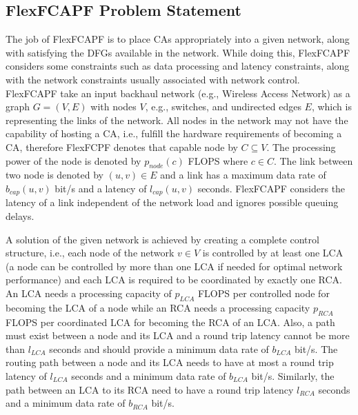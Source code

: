 \subsection{FlexFCAPF Problem Statement}\label{sec:ffps}
The job of FlexFCAPF is to place CAs appropriately into a given network, along with satisfying the DFGs available in the network. While doing this, FlexFCAPF considers some constraints such as data processing and latency constraints, along with the network constraints usually associated with network control. FlexFCAPF take an input backhaul network (e.g., Wireless Access Network) as a graph $G = ( V, E )$ with nodes $V$, e.g., switches, and undirected edges $E$, which is representing the links of the network. All nodes in the network may not have the capability of hosting a CA, i.e., fulfill the hardware requirements of becoming a CA, therefore FlexFCPF denotes that capable node by $C \subseteq V$. The processing power of the node is denoted by $p_{node} ( c )$ FLOPS where $c \in C$. The link between two node is denoted by $( u, v ) \in E$ and a link has a maximum data rate of $b_{cap} ( u, v )$ bit/s and a latency of $l_{cap} ( u , v )$ seconds. FlexFCAPF considers the latency of a link independent of the network load and ignores possible queuing delays.

A solution of the given network is achieved by creating a complete control structure, i.e., each node of the network $v \in V$ is controlled by at least one LCA (a node can be controlled by more than one LCA if needed for optimal network performance) and each LCA is required to be coordinated by exactly one RCA. An LCA needs a processing capacity of $p_{LCA}$ FLOPS per controlled node for becoming the LCA of a node while an RCA needs a processing capacity $p_{RCA}$FLOPS per coordinated LCA for becoming the RCA of an LCA. Also, a path must exist between a node and its LCA and a round trip latency cannot be more than $l_{LCA}$ seconds and should provide a minimum data rate of $b_{LCA}$ bit/s. The routing path between a node and its LCA needs to have at most a round trip latency of $l_{LCA}$ seconds and a minimum data rate of $b_{LCA}$ bit/s. Similarly, the path between an LCA to its RCA need to have a round trip latency $l_{RCA}$ seconds and a minimum data rate of $b_{RCA}$ bit/s.

